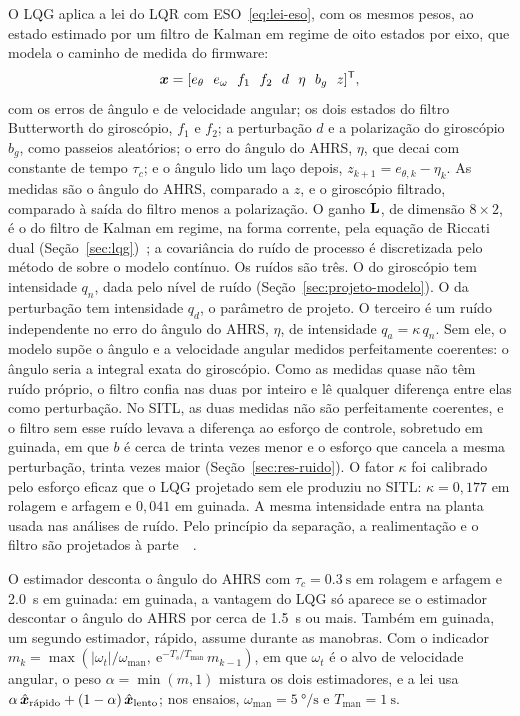 O LQG aplica a lei do LQR com ESO~\eqref{eq:lei-eso}, com os mesmos pesos, ao
estado estimado por um filtro de Kalman em regime de oito estados por eixo,
que modela o caminho de medida do firmware:
\begin{equation}
\vetor{x} = [e_\theta\ \ e_\omega\ \ f_1\ \ f_2\ \ d\ \ \eta\ \ b_g\ \
z]^{\mathsf{T}},
\label{eq:estados-lqg}
\end{equation}
com os erros de ângulo e de velocidade angular; os dois estados do filtro
Butterworth do giroscópio, $f_1$ e $f_2$; a perturbação $d$ e a polarização
do giroscópio $b_g$, como passeios aleatórios; o erro do ângulo do AHRS,
$\eta$, que decai com constante de tempo $\tau_c$; e o ângulo lido um laço
depois, $z_{k+1} = e_{\theta,k} - \eta_k$. As medidas são o ângulo do AHRS,
comparado a $z$, e o giroscópio filtrado, comparado à saída do filtro menos
a polarização. O ganho $\mathbf{L}$, de dimensão $8 \times 2$, é o do filtro
de Kalman em regime, na forma corrente, pela equação de Riccati dual
(Seção~\ref{sec:lqg})~\cite{kalman1960b}; a covariância do ruído de processo
é discretizada pelo método de \citeonline{vanloan1978} sobre o modelo
contínuo. Os ruídos são três. O do giroscópio tem intensidade $q_n$, dada
pelo nível de ruído (Seção~\ref{sec:projeto-modelo}). O da perturbação tem
intensidade $q_d$, o parâmetro de projeto. O terceiro é um ruído independente
no erro do ângulo do AHRS, $\eta$, de intensidade $q_a = \kappa\,q_n$. Sem
ele, o modelo supõe o ângulo e a velocidade angular medidos perfeitamente
coerentes: o ângulo seria a integral exata do giroscópio. Como as medidas
quase não têm ruído próprio, o filtro confia nas duas por inteiro e lê
qualquer diferença entre elas como perturbação. No SITL, as duas medidas não
são perfeitamente coerentes, e o filtro sem esse ruído levava a diferença ao
esforço de controle, sobretudo em guinada, em que $b$ é cerca de trinta vezes
menor e o esforço que cancela a mesma perturbação, trinta vezes maior
(Seção~\ref{sec:res-ruido}). O fator $\kappa$ foi calibrado pelo esforço
eficaz que o LQG projetado sem ele produziu no SITL: $\kappa = 0{,}177$ em
rolagem e arfagem e $0{,}041$ em guinada. A mesma intensidade entra na planta
usada nas análises de ruído. Pelo princípio da separação, a realimentação e
o filtro são projetados à
parte~\cite{joseph1961,athans1971}~\cite[seção~8.2]{anderson1989}.

O estimador desconta o ângulo do AHRS com $\tau_c = \SI{0.3}{\second}$ em
rolagem e arfagem e \SI{2.0}{\second} em guinada: em guinada, a vantagem do
LQG só aparece se o estimador descontar o ângulo do AHRS por cerca de
\SI{1.5}{\second} ou mais. Também em guinada, um segundo estimador, rápido,
assume durante as manobras. Com o indicador
$m_k = \max\left(|\omega_t|/\omega_{\mathrm{man}},\ \mathrm{e}^{-T_s/T_{\mathrm{man}}}\,m_{k-1}\right)$,
em que $\omega_t$ é o alvo de velocidade angular, o peso
$\alpha = \min(m, 1)$ mistura os dois estimadores, e a lei usa
$\alpha\,\hat{\bm{x}}_{\text{rápido}} + (1-\alpha)\,\hat{\bm{x}}_{\text{lento}}$;
nos ensaios, $\omega_{\mathrm{man}} = \SI{5}{\degree\per\second}$ e
$T_{\mathrm{man}} = \SI{1}{\second}$.

